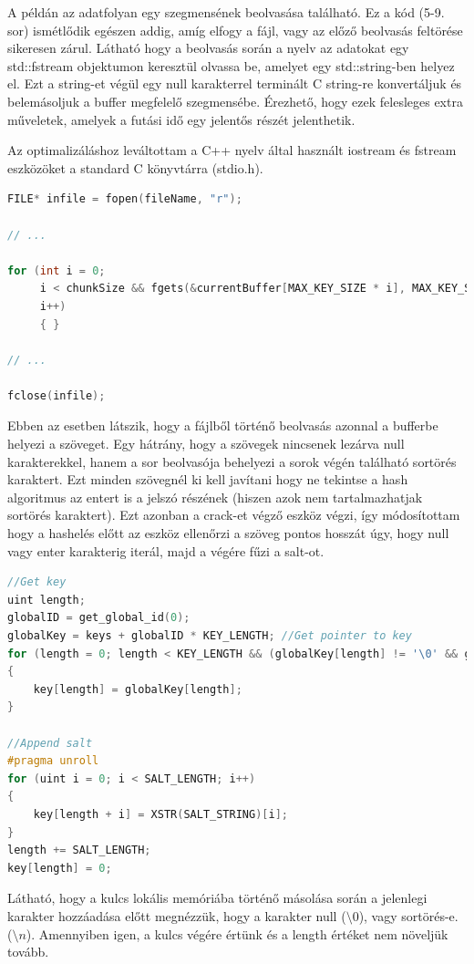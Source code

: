 A példán az adatfolyan egy szegmensének beolvasása található. Ez a kód (5-9. sor) ismétlődik egészen addig, amíg elfogy a fájl, vagy az előző beolvasás feltörése sikeresen zárul. Látható hogy a beolvasás során a nyelv az adatokat egy std::fstream objektumon keresztül olvassa be, amelyet egy std::string-ben helyez el. Ezt a string-et végül egy null karakterrel terminált C string-re konvertáljuk és belemásoljuk a buffer megfelelő szegmensébe. Érezhető, hogy ezek felesleges extra műveletek, amelyek a futási idő egy jelentős részét jelenthetik.

Az optimalizáláshoz leváltottam a C++ nyelv által használt iostream és fstream eszközöket a standard C könyvtárra (stdio.h).

\begin{lstlisting}[language={C}]
FILE* infile = fopen(fileName, "r");

// ...

for (int i = 0;
     i < chunkSize && fgets(&currentBuffer[MAX_KEY_SIZE * i], MAX_KEY_SIZE, infile) != NULL;
     i++)
     { }

// ...

fclose(infile);
\end{lstlisting}

Ebben az esetben látszik, hogy a fájlből történő beolvasás azonnal a bufferbe helyezi a szöveget. Egy hátrány, hogy a szövegek nincsenek lezárva null karakterekkel, hanem a sor beolvasója behelyezi a sorok végén található sortörés karaktert. Ezt minden szövegnél ki kell javítani hogy ne tekintse a hash algoritmus az entert is a jelszó részének (hiszen azok nem tartalmazhatjak sortörés karaktert). Ezt azonban a crack-et végző eszköz végzi, így módosítottam hogy a hashelés előtt az eszköz ellenőrzi a szöveg pontos hosszát úgy, hogy null vagy enter karakterig iterál, majd a végére fűzi a salt-ot.

\begin{lstlisting}[language={C++}]
//Get key
uint length;
globalID = get_global_id(0);
globalKey = keys + globalID * KEY_LENGTH; //Get pointer to key
for (length = 0; length < KEY_LENGTH && (globalKey[length] != '\0' && globalKey[length] != '\n'); length++)
{
    key[length] = globalKey[length];
}

//Append salt
#pragma unroll
for (uint i = 0; i < SALT_LENGTH; i++)
{
    key[length + i] = XSTR(SALT_STRING)[i];
}
length += SALT_LENGTH;
key[length] = 0;
\end{lstlisting}

Látható, hogy a kulcs lokális memóriába történő másolása során a jelenlegi karakter hozzáadása előtt megnézzük, hogy a karakter null ($\setminus 0$), vagy sortörés-e. ($\setminus n$). Amennyiben igen, a kulcs végére értünk és a length értéket nem növeljük tovább.